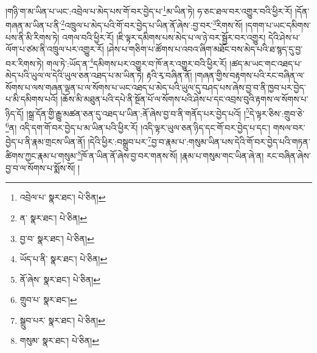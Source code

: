 །གཉི་ག་མ་ཡིན་པ་ཡང་:འབྲེལ་པ་མེད་པས་གོ་བར་བྱེད་པ་\footnote{འབྲེལ་པ་  སྣར་ཐང་།  པེ་ཅིན། }མ་ཡིན་ཏེ། ཧ་ཅང་ཐལ་བར་འགྱུར་བའི་ཕྱིར་རོ། །དོན་གཞན་མ་ཡིན་པ་ནི་\footnote{ན་  སྣར་ཐང་།  པེ་ཅིན། }འཁྲུལ་པ་མེད་པའི་གོ་བར་བྱེད་པ་ཡིན་ནོ་ཞེས་:བྱ་བར་\footnote{བྱ་བ་  སྣར་ཐང་།  པེ་ཅིན། }རིགས་སོ། །དགག་པ་ཡང་དམིགས་པས་ནི་མི་རིགས་ཏེ། འགལ་བའི་ཕྱིར་རོ། །ཇི་ལྟར་དམིགས་པས་མེད་པ་ལ་ཉེ་བར་སྦྱོར་བར་འགྱུར། དེའི་ཤེས་པ་ལོག་པ་ཙམ་ནི་འཁྲུལ་པར་འགྱུར་རོ། །ཤེས་པ་གཅིག་པ་ཚོགས་པ་འབའ་ཞིག་མཐོང་བས་མེད་པའི་ཐ་སྙད་དུ་བྱ་བར་རིགས་ཏེ། གལ་ཏེ་:ཡོད་ན་\footnote{ཡོད་པ་ནི་  སྣར་ཐང་།  པེ་ཅིན། }དམིགས་པར་འགྱུར་བ་ཁོ་ནར་འགྱུར་བའི་ཕྱིར་རོ། །ཚད་མ་ཡང་གང་འཐད་པ་མེད་པའི་ཡུལ་ལ་དེའི་ཡུལ་ཅན་འཐད་པ་མ་ཡིན་ཏེ། རྟའི་རྭ་བཞིན་ནོ། །གཞན་གྱིས་བརྟགས་པའི་རང་བཞིན་ལ་སོགས་པ་ལས་གཞན་ལྡན་པ་ལ་སོགས་པ་ཡང་འཐད་པ་མེད་པའི་ཡུལ་དུ་བཤད་པས་ཞེས་བྱ་བ་ནི་ཁྱབ་པར་བྱེད་པ་མི་དམིགས་པའོ། །ཆོས་མི་མཐུན་པའི་དཔེ་ནི་སྔོན་པོ་ལ་སོགས་པའི་ཤེས་པ་དང་འབྲས་བུའི་རྟགས་ལ་སོགས་པ་ཉིད་དོ། །སྒྲ་དོན་གྱི་རྒྱུ་མཚན་ཅན་དུ་འཐད་པ་ཡིན་:ནོ་ཞེས་བྱ་བ་ནི་གནོད་པར་བྱེད་པའོ། །\footnote{ནོ་ཞེས་  སྣར་ཐང་།  པེ་ཅིན། }དེ་ལྟར་ཅིས་:གྲུབ་ཅེ་\footnote{གྲུབ་པ་  སྣར་ཐང་། }ན། འདི་དག་གོ་བར་བྱེད་པ་མ་ཡིན་པའི་ཕྱིར་རོ། །འདི་ལྟར་ཡུལ་ཅན་ཉིད་དང་གོ་བར་བྱེད་པ་དང་། གསལ་བར་བྱེད་པ་ནི་རྣམ་གྲངས་ཡིན་ནོ། །དེའི་ཕྱིར་:བསྒྲུབ་པར་\footnote{སྒྲུབ་པར་  སྣར་ཐང་།  པེ་ཅིན། }བྱ་བ་རྣམ་པ་:གསུམ་ཡིན་པས་དེའི་གོ་བར་བྱེད་པའི་གཏན་ཚིགས་ཀྱང་རྣམ་པ་གསུམ་\footnote{གསུམ་  སྣར་ཐང་།  པེ་ཅིན། }ཁོ་ན་ཡིན་ནོ་ཞེས་བྱ་བར་གནས་སོ། །རྣམ་པ་གསུམ་གང་ཡིན་ཞེ་ན། རང་བཞིན་ཞེས་བྱ་བ་ལ་སོགས་པ་སྨོས་སོ། །

